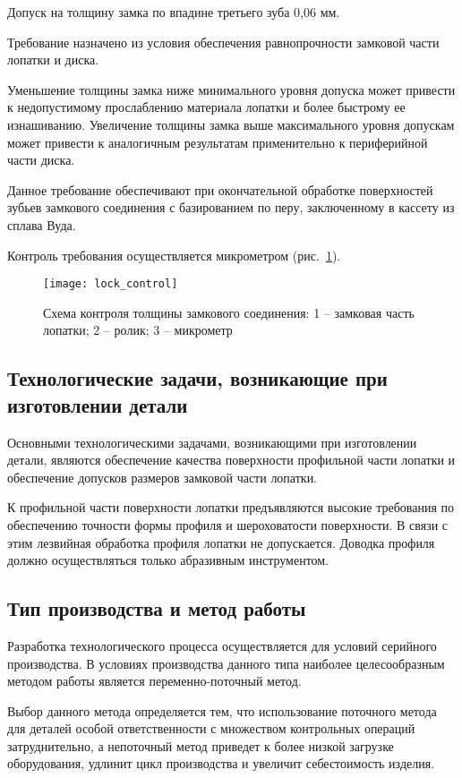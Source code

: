 Допуск на толщину замка по впадине третьего зуба 0,06 мм.

Требование назначено из условия обеспечения равнопрочности замковой части лопатки и диска.

Уменьшение толщины замка ниже минимального уровня допуска может привести к недопустимому прослаблению материала лопатки и более быстрому ее изнашиванию. Увеличение толщины замка выше максимального уровня допускам может привести к аналогичным результатам применительно к периферийной части диска.

Данное требование обеспечивают при окончательной обработке поверхностей зубьев замкового соединения с базированием по перу, заключенному в кассету из сплава Вуда.

Контроль требования осуществляется микрометром (рис.~\ref{img:lock_control}).

\begin{figure}[H]
	\centering
	\texttt{[image: lock\_control]}
	\caption{Схема контроля толщины замкового соединения: 1 – замковая часть лопатки; 2 – ролик; 3 – микрометр}
	\label{img:lock_control}
\end{figure}

\subsection{Технологические задачи, возникающие при изготовлении детали}

Основными технологическими задачами, возникающими при изготовлении детали, являются обеспечение качества поверхности профильной части лопатки и обеспечение допусков размеров замковой части лопатки.

К профильной части поверхности лопатки предъявляются высокие требования по обеспечению точности формы профиля и шероховатости поверхности. В связи с этим лезвийная обработка профиля лопатки не допускается. Доводка профиля должно осуществляться только абразивным инструментом.

\subsection{Тип производства и метод работы}

Разработка технологического процесса осуществляется для условий серийного производства. В условиях производства данного типа наиболее целесообразным методом работы является переменно-поточный метод.

Выбор данного метода определяется тем, что использование поточного метода для деталей особой ответственности с множеством контрольных операций затруднительно, а непоточный метод приведет к более низкой загрузке оборудования, удлинит цикл производства и увеличит себестоимость изделия.

